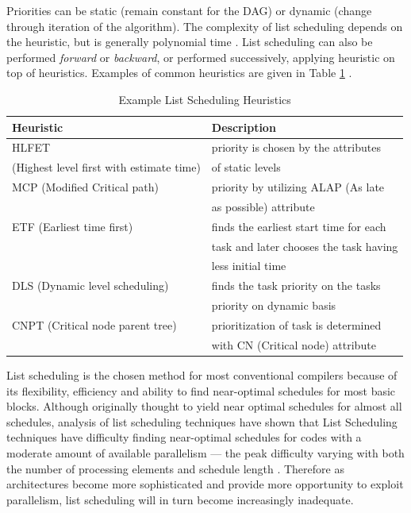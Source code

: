 \documentclass[12pt]{report}
\begin{document}
Priorities can be static (remain constant for the DAG) or dynamic (change
through iteration of the algorithm). The complexity of list scheduling
depends on the heuristic, but is generally polynomial time
\parencite{wang2018list}. List scheduling can also be performed \emph{forward} or
\emph{backward}, or performed successively, applying heuristic on top of
heuristics. Examples of common heuristics are given in Table
\ref{tab:ListHeuristics} \parencite{sarangal2018list}.



\begin{table}[htbp]
\caption{\label{tab:ListHeuristics}Example List Scheduling Heuristics}
\centering
\begin{tabular}{ll}
\textbf{Heuristic} & \textbf{Description}\\
\hline
HLFET & priority is chosen by the attributes\\
(Highest level first with estimate time) & of static levels\\
\hline
MCP (Modified Critical path) & priority by utilizing ALAP (As late\\
 & as possible) attribute\\
\hline
ETF (Earliest time first) & finds the earliest start time for each\\
 & task and later chooses the task having\\
 & less initial time\\
\hline
DLS (Dynamic level scheduling) & finds the task priority on the tasks\\
 & priority on dynamic basis\\
\hline
CNPT (Critical node parent tree) & prioritization of task is determined\\
 & with CN (Critical node) attribute\\
\hline
\end{tabular}
\end{table}


List scheduling is the chosen method for most conventional compilers because
of its flexibility, efficiency and ability to find near-optimal schedules for
most basic blocks. Although originally thought to yield near optimal
schedules for almost all schedules, analysis of list scheduling techniques
have shown that List Scheduling techniques have difficulty finding
near-optimal schedules for codes with a moderate amount of available
parallelism --- the peak difficulty varying with both the number of
processing elements and schedule length \parencite{cooper1998experimental}.
Therefore as architectures become more sophisticated and provide more
opportunity to exploit parallelism, list scheduling will in turn become
increasingly inadequate.
\end{document}
